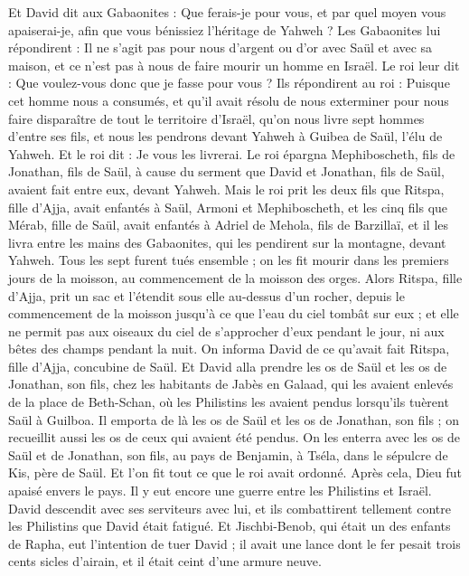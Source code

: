 \begin{multicols}{2}
Et David dit aux Gabaonites : Que ferais-je pour vous, et par quel moyen vous apaiserai-je, afin que vous bénissiez l'héritage de Yahweh ?
Les Gabaonites lui répondirent : Il ne s'agit pas pour nous d'argent ou d'or avec Saül et avec sa maison, et ce n'est pas à nous de faire mourir un homme en Israël. Le roi leur dit : Que voulez-vous donc que je fasse pour vous ?
Ils répondirent au roi : Puisque cet homme nous a consumés, et qu'il avait résolu de nous exterminer pour nous faire disparaître de tout le territoire d'Israël,
qu'on nous livre sept hommes d'entre ses fils, et nous les pendrons devant Yahweh à Guibea de Saül, l'élu de Yahweh. Et le roi dit : Je vous les livrerai.
Le roi épargna Mephiboscheth, fils de Jonathan, fils de Saül, à cause du serment que David et Jonathan, fils de Saül, avaient fait entre eux, devant Yahweh.
Mais le roi prit les deux fils que Ritspa, fille d'Ajja, avait enfantés à Saül, Armoni et Mephiboscheth, et les cinq fils que Mérab, fille de Saül, avait enfantés à Adriel de Mehola, fils de Barzillaï,
et il les livra entre les mains des Gabaonites, qui les pendirent sur la montagne, devant Yahweh. Tous les sept furent tués ensemble ; on les fit mourir dans les premiers jours de la moisson, au commencement de la moisson des orges.
Alors Ritspa, fille d'Ajja, prit un sac et l'étendit sous elle au-dessus d'un rocher, depuis le commencement de la moisson jusqu'à ce que l'eau du ciel tombât sur eux ; et elle ne permit pas aux oiseaux du ciel de s'approcher d'eux pendant le jour, ni aux bêtes des champs pendant la nuit.
On informa David de ce qu'avait fait Ritspa, fille d'Ajja, concubine de Saül.
Et David alla prendre les os de Saül et les os de Jonathan, son fils, chez les habitants de Jabès en Galaad, qui les avaient enlevés de la place de Beth-Schan, où les Philistins les avaient pendus lorsqu'ils tuèrent Saül à Guilboa.
Il emporta de là les os de Saül et les os de Jonathan, son fils ; on recueillit aussi les os de ceux qui avaient été pendus.
On les enterra avec les os de Saül et de Jonathan, son fils, au pays de Benjamin, à Tséla, dans le sépulcre de Kis, père de Saül. Et l'on fit tout ce que le roi avait ordonné. Après cela, Dieu fut apaisé envers le pays.
Il y eut encore une guerre entre les Philistins et Israël. David descendit avec ses serviteurs avec lui, et ils combattirent tellement contre les Philistins que David était fatigué.
Et Jischbi-Benob, qui était un des enfants de Rapha, eut l'intention de tuer David ; il avait une lance dont le fer pesait trois cents sicles d'airain, et il était ceint d'une armure neuve.

\end{multicols}
